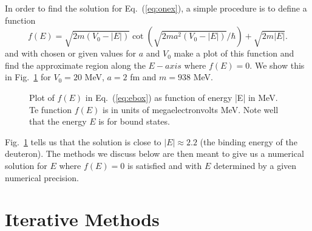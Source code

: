 In order to find the solution 
for Eq.\ (\ref{eq:onex}), a simple procedure is to define a function
\begin{equation}
   f(E)=\sqrt{2m(V_0-|E|)}\cot{(\sqrt{2ma^2(V_0-|E|)}/\hbar)}+\sqrt{2m|E|}. 
   \label{eq:ebox}
\end{equation}
and with chosen or given values for $a$ and $V_0$ make a plot of this function and find the 
approximate region along the $E-axis$ where 
$f(E)=0$. We show this in Fig.\ \ref{fig:chap8fig1} for $V_0=20$ MeV, $a=2$ fm and $m=938$ MeV.
\begin{figure}
   
   \caption{Plot of $f(E)$ in Eq.\ (\ref{eq:ebox}) as function of energy |E| in MeV. Te function $f(E)$ is in units of megaelectronvolts MeV. Note well that the energy $E$ is for bound states.}
   \label{fig:chap8fig1}
\end{figure}
Fig.\ \ref{fig:chap8fig1} tells us that the solution is close to $|E|\approx 2.2$ (the binding
energy of the deuteron). The methods we discuss
below are then meant to give us a numerical solution for $E$ where $f(E)=0$ is
satisfied and with $E$ determined by a given numerical precision. 

\section{Iterative Methods}

